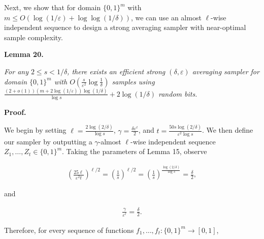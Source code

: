 \documentclass[10pt,a4paper]{article}
\begin{document}
Next, we show that for domain $\{0,1\}^{m}$ with $m\leq O(\log(1/\varepsilon)+\log\log(1/\delta))$, we can use an almost $\ell$-wise independent sequence to design a strong averaging sampler with near-optimal sample complexity.\par





\par\medskip\noindent\textbf{
\textbf{Lemma 20}\textbf{.}
}\par



\emph{For any $2\leq s<1/\delta$, there exists an efficient strong $(\delta,\varepsilon)$ averaging sampler for domain $\{0,1\}^{m}$ with $O(\frac{s}{\varepsilon^{2}}\log\frac{1}{\delta})$ samples using
${\frac{(2+o(1))(m+2\log(1/\varepsilon))\log(1/\delta)}{\log s}}+2\log(1/\delta)$
random bits.}\par







\par\medskip\noindent\textbf{Proof.}\par




We begin by setting $\ell=\frac{2\log(2/\delta)}{\log s}$, $\gamma=\frac{\delta\varepsilon^{\ell}}{2}$, and $t=\frac{50s\log(2/\delta)}{\varepsilon^{2}\log s}$. We then define our sampler by outputting a $\gamma$-almost $\ell$-wise independent sequence $Z_{1},\dots,Z_{t}\in\{0,1\}^{m}$.
Taking the parameters of Lemma 15, observe\par


\[\begin{gathered}
\left(\frac{25{\ell}}{\varepsilon^{2}{t}}\right)^{\ell/2}=\left(\frac{1}{s}\right)^{\ell/2}=\left(\frac{1}{s}\right)^{\frac{\log(2/\delta)}{\log s}}=\frac{\delta}{2},
\end{gathered}\]


and\par


\[\begin{gathered}
\frac{\gamma}{\varepsilon^{\ell}}=\frac{\delta}{2}.
\end{gathered}\]


Therefore, for every sequence of functions $f_{1},\dots,f_{t}:\{0,1\}^{m}\to[0,1]$,\par
\end{document}
